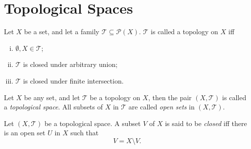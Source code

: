 \section{Topological Spaces}



\begin{definition}
	[topology]
	\label{def: topology}
	Let $X$ be a set, and let a family $\mathcal T \subseteq \mathcal P(X)$. $\mathcal T$ is called a topology on $X$ iff
	\begin{enumerate}[(i)]
		\item $\emptyset, X \in \mathcal T$;
		\item $\mathcal T$ is closed under arbitrary union;
		\item $\mathcal T$ is closed under finite intersection.
	\end{enumerate}
\end{definition}


\begin{definition}
	\label{def: topological spaces}
	Let $X$ be any set, and let $\mathcal T$ be a topology on $X$, then the pair $(X, \mathcal T)$ is called a \textit{topological space}. All subsets of $X$ in $\mathcal T$ are called \textit{open sets} in $(X, \mathcal T)$.
\end{definition}


\begin{definition}
	\label{def: closed sets}
	Let $(X, \mathcal T)$ be a topological space. A subset $V$ of $X$ is said to be \textit{closed} iff there is an open set $U$ in $X$ such that
	$$
	V = X \setminus V.
	$$
\end{definition}


